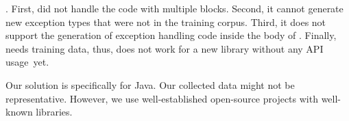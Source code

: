 
. First, {\tool} did not handle the code with multiple 
blocks. Second, it cannot generate new exception types that were not
in the training corpus. Third, it does not support the generation of
exception handling code inside the body of . Finally,
{\tool} needs training data, thus, does not work for a new library
without any API usage~yet.

Our solution is specifically for Java. Our collected data might not be
representative. However, we use well-established open-source projects with
well-known libraries.
